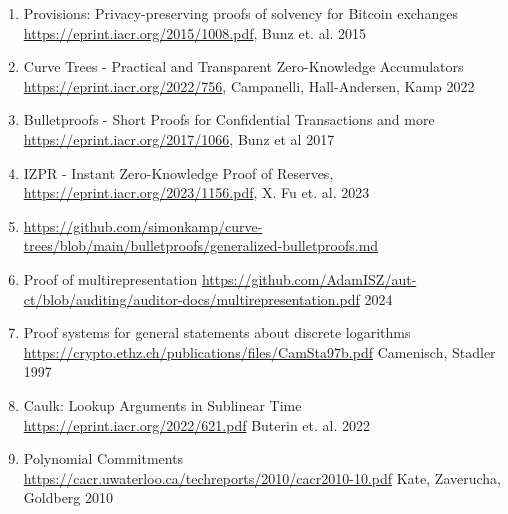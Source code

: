 \documentclass[10pt,a4paper]{article}
\providecommand{\tightlist}{%
  \setlength{\itemsep}{0pt}\setlength{\parskip}{0pt}}
\begin{document}
\begin{enumerate}
\def\labelenumi{\arabic{enumi}.}
\tightlist
\item
  \protect\hypertarget{anchor-1}{}{}Provisions: Privacy-preserving proofs of solvency for Bitcoin exchanges
  \url{https://eprint.iacr.org/2015/1008.pdf}, Bunz et. al. 2015
\item
  \protect\hypertarget{anchor-2}{}{}Curve Trees - Practical and Transparent Zero-Knowledge Accumulators
  \url{https://eprint.iacr.org/2022/756}, Campanelli, Hall-Andersen, Kamp 2022
 \item
  \protect\hypertarget{anchor-3}{}{}Bulletproofs - Short Proofs for Confidential Transactions and more
  \url{https://eprint.iacr.org/2017/1066}, Bunz et al 2017
\item
  \protect\hypertarget{anchor-4}{}{}IZPR - Instant Zero-Knowledge Proof of Reserves,
  \url{https://eprint.iacr.org/2023/1156.pdf}, X. Fu et. al. 2023
 \item
 \protect\hypertarget{anchor-5}{}{} \url{https://github.com/simonkamp/curve-trees/blob/main/bulletproofs/generalized-bulletproofs.md}
\item
  \protect\hypertarget{anchor-6}{}{} Proof of multirepresentation
  \url{https://github.com/AdamISZ/aut-ct/blob/auditing/auditor-docs/multirepresentation.pdf} 2024
\item
  \protect\hypertarget{anchor-7}{}{} Proof systems for general statements about discrete logarithms
  \url{https://crypto.ethz.ch/publications/files/CamSta97b.pdf} Camenisch, Stadler 1997
 \item
  \protect\hypertarget{anchor-8}{}{} Caulk: Lookup Arguments in Sublinear Time
  \url{https://eprint.iacr.org/2022/621.pdf} Buterin et. al. 2022
 \item
 \protect\hypertarget{anchor-9}{}{} Polynomial Commitments
 \url{https://cacr.uwaterloo.ca/techreports/2010/cacr2010-10.pdf} Kate, Zaverucha, Goldberg 2010
\end{enumerate}
\end{document}
